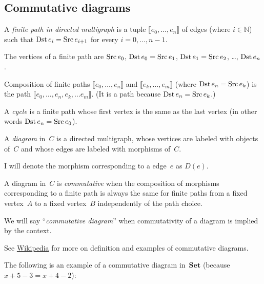 \subsection{Commutative diagrams}
\begin{defn}
A \emph{finite path in directed multigraph} is a tuple $\llbracket e_{0},\ldots,e_{n}\rrbracket$
of edges (where $i\in\mathbb{N}$) such that $\operatorname{Dst} e_{i}=\operatorname{Src} e_{i+1}$
for every $i=0,\dots,n-1$.
\end{defn}

\begin{defn}
The vertices of a finite path are $\operatorname{Src} e_{0}$, $\operatorname{Dst} e_{0}=\operatorname{Src} e_{1}$,
$\operatorname{Dst} e_{1}=\operatorname{Src} e_{2}$, \ldots{}, $\operatorname{Dst} e_{n}$.
\end{defn}

\begin{defn}
Composition of finite paths $\llbracket e_{0},\ldots,e_{n}\rrbracket$
and $\llbracket e_{k},\ldots,e_{m}\rrbracket$ (where $\operatorname{Dst} e_{n}=\operatorname{Src} e_{k}$)
is the path $\llbracket e_{0},\ldots,e_{n},e_{k},\dots e_{m}\rrbracket$.
(It is a path because $\operatorname{Dst} e_{n}=\operatorname{Src} e_{k}$.)
\end{defn}

\begin{defn}
A \emph{cycle} is a finite path whose first vertex is the same as
the last vertex (in other words $\operatorname{Dst} e_{n}=\operatorname{Src} e_{0}$).
\end{defn}

\begin{defn}
A \emph{diagram} in~$C$ is a directed multigraph, whose vertices
are labeled with objects of~$C$ and whose edges are labeled with
morphisms of~$C$.

I will denote the morphism corresponding to a edge~$e$ as $D(e)$.
\end{defn}

\begin{defn}
A diagram in~$C$ is \emph{commutative} when the composition of morphisms
corresponding to a finite path is always the same for finite paths
from a fixed vertex~$A$ to a fixed vertex~$B$ independently of the
path choice.

We will say ``\emph{commutative diagram}'' when commutativity of
a diagram is implied by the context.\end{defn}
\begin{rem}
See \href{https://en.wikipedia.org/wiki/Commutative_diagram}{Wikipedia}
for more on definition and examples of commutative diagrams.
\end{rem}
The following is an example of a commutative diagram in~$\mathbf{Set}$
(because $x+5-3=x+4-2$):

